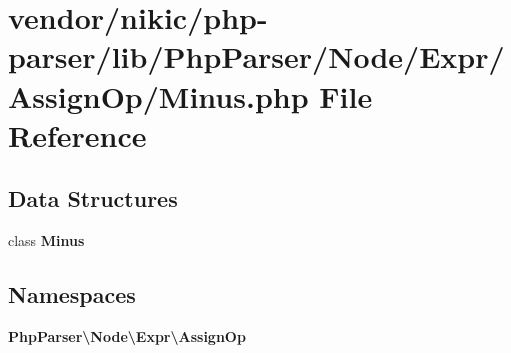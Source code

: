\section{vendor/nikic/php-\/parser/lib/\+Php\+Parser/\+Node/\+Expr/\+Assign\+Op/\+Minus.php File Reference}
\label{_assign_op_2_minus_8php}
\subsection*{Data Structures}
\begin{DoxyCompactItemize}
\item 
class {\bf Minus}
\end{DoxyCompactItemize}
\subsection*{Namespaces}
\begin{DoxyCompactItemize}
\item 
 {\bf Php\+Parser\textbackslash{}\+Node\textbackslash{}\+Expr\textbackslash{}\+Assign\+Op}
\end{DoxyCompactItemize}

